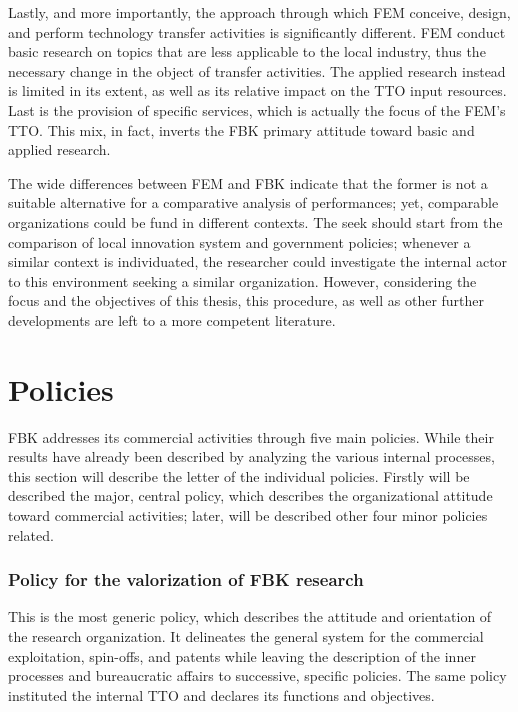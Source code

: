 Lastly, and more importantly, the approach through which FEM conceive, design, and perform technology transfer activities is significantly different. FEM conduct basic research on topics that are less applicable to the local industry, thus the necessary change in the object of transfer activities. The applied research instead is limited in its extent, as well as its relative impact on the TTO input resources. Last is the provision of specific services, which is actually the focus of the FEM's TTO. This mix, in fact, inverts the FBK primary attitude toward basic and applied research.

The wide differences between FEM and FBK indicate that the former is not a suitable alternative for a comparative analysis of performances; yet, comparable organizations could be fund in different contexts. The seek should start from the comparison of local innovation system and government policies; whenever a similar context is individuated, the researcher could investigate the internal actor to this environment seeking a similar organization. However, considering the focus and the objectives of this thesis, this procedure, as well as other further developments are left to a more competent literature.

\section{Policies}

FBK addresses its commercial activities through five main policies. While their results have already been described by analyzing the various internal processes, this section will describe the letter of the individual policies. Firstly will be described the major, central policy, which describes the organizational attitude toward commercial activities; later, will be described other four minor policies related.

\subsubsection{Policy for the valorization of FBK research}

This is the most generic policy, which describes the attitude and orientation of the research organization. It delineates the general system for the commercial exploitation, spin-offs, and patents while leaving the description of the inner processes and bureaucratic affairs to successive, specific policies. The same policy instituted the internal TTO and declares its functions and objectives.

